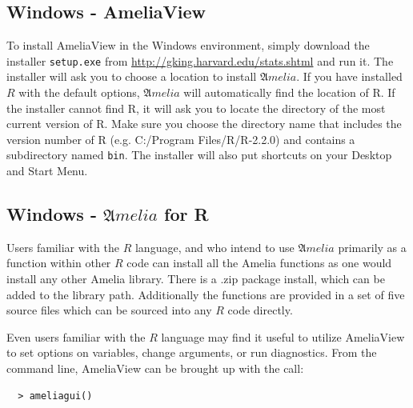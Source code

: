 \documentclass[12pt,titlepage]{article}
\newcommand{\Amelia}{\ensuremath{\mathfrak Amelia} }
\begin{document}
\subsection{Windows - AmeliaView}
\label{sec:win-install}
To install AmeliaView in the Windows environment, simply download the
installer \texttt{setup.exe} from
\url{http://gking.harvard.edu/stats.shtml} and run it.  The installer
will ask you to choose a location to install ${\mathfrak Amelia}$.  If
you have installed $R$ with the default options, ${\mathfrak Amelia}$
will automatically find the location of R.  If the installer cannot
find R, it will ask you to locate the directory of the most current
version of R.  Make sure you choose the directory name that includes
the version number of R (e.g. C:/Program Files/R/R-2.2.0) and contains
a subdirectory named \texttt{bin}.  The installer will also put
shortcuts on your Desktop and Start Menu.

\subsection{Windows - \Amelia for R}

Users familiar with the $R$ language, and who intend to use \Amelia
primarily as a function within other $R$ code can install all the
Amelia functions as one would install any other Amelia library.  There
is a .zip package install, which can be added to the library path.
Additionally the functions are provided in a set of five source files
which can be sourced into any $R$ code directly.

Even users familiar with the $R$ language may find it useful to
utilize AmeliaView to set options on variables, change arguments, or
run diagnostics.  From the command line, AmeliaView can be brought up
with the call:
  \begin{verbatim}
  > ameliagui()
  \end{verbatim}
\end{document}
